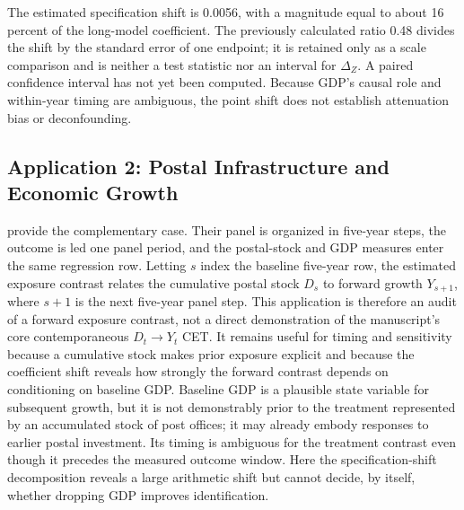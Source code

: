 \documentclass[
]{article}
\begin{document}
The estimated specification shift is 0.0056, with a magnitude equal to
about 16 percent of the long-model coefficient. The previously
calculated ratio 0.48 divides the shift by the standard error of one
endpoint; it is retained only as a scale comparison and is neither a
test statistic nor an interval for \(\Delta_Z\). A paired confidence
interval has not yet been computed. Because GDP's causal role and
within-year timing are ambiguous, the point shift does not establish
attenuation bias or deconfounding.

\subsection{\texorpdfstring{Application 2: Postal Infrastructure and
Economic Growth
\label{sec:app_rogowski_pa}}{Application 2: Postal Infrastructure and Economic Growth }}\label{application-2-postal-infrastructure-and-economic-growth}

\citet{rogowski_etal2022} provide the complementary case. Their panel is
organized in five-year steps, the outcome is led one panel period, and
the postal-stock and GDP measures enter the same regression row. Letting
\(s\) index the baseline five-year row, the estimated exposure contrast
relates the cumulative postal stock \(D_s\) to forward growth
\(Y_{s+1}\), where \(s+1\) is the next five-year panel step. This
application is therefore an audit of a forward exposure contrast, not a
direct demonstration of the manuscript's core contemporaneous
\(D_t\rightarrow Y_t\) CET. It remains useful for timing and sensitivity
because a cumulative stock makes prior exposure explicit and because the
coefficient shift reveals how strongly the forward contrast depends on
conditioning on baseline GDP. Baseline GDP is a plausible state variable
for subsequent growth, but it is not demonstrably prior to the treatment
represented by an accumulated stock of post offices; it may already
embody responses to earlier postal investment. Its timing is ambiguous
for the treatment contrast even though it precedes the measured outcome
window. Here the specification-shift decomposition reveals a large
arithmetic shift but cannot decide, by itself, whether dropping GDP
improves identification.
\end{document}
